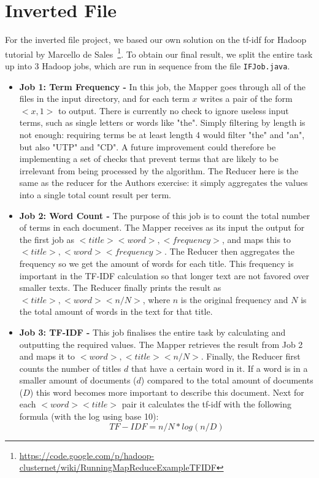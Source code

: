 \documentclass[11pt]{article}
\begin{document}
\section{Inverted File}
For the inverted file project, we based our own solution on the tf-idf for Hadoop tutorial by Marcello de Sales~\footnote{\url{https://code.google.com/p/hadoop-clusternet/wiki/RunningMapReduceExampleTFIDF}}. To obtain our final result, we split the entire task up into 3 Hadoop jobs, which are run in sequence from the file \lstinline{IFJob.java}.

\begin{itemize}

\item \textbf{Job 1: Term Frequency -} In this job, the Mapper goes through all of the files in the input directory, and for each term $x$ writes a pair of the form $<x, 1>$ to output. There is currently no check to ignore useless input terms, such as single letters or words like "the". Simply filtering by length is not enough: requiring terms be at least length 4 would filter "the" and "an", but also "UTP" and "CD". A future improvement could therefore be implementing a set of checks that prevent terms that are likely to be irrelevant from being processed by the algorithm.
The Reducer here is the same as the reducer for the Authors exercise: it simply aggregates the values into a single total count result per term.
\item \textbf{Job 2: Word Count -} The purpose of this job is to count the total number of terms in each document. The Mapper receives as its input the output for the first job as $<title><word>,<frequency>$, and maps this to $<title>, <word><frequency>$. The Reducer then aggregates the frequency so we get the amount of words for each title. This frequency is important in the TF-IDF calculation so that longer text are not favored over smaller texts. The Reducer finally prints the result as $<title>, <word><n/N>$, where $n$ is the original frequency and $N$ is the total amount of words in the text for that title.
\item \textbf{Job 3: TF-IDF -} This job finalises the entire task by calculating and outputting the required values. The Mapper retrieves the result from Job 2 and maps it to $<word>, <title><n/N>$. Finally, the Reducer first counts the number of titles $d$ that have a certain word in it. If a word is in a smaller amount of documents ($d$) compared to the total amount of documents ($D$) this word becomes more important to describe this document. Next for each $<word><title>$ pair it calculates the tf-idf with the following formula (with the log using base 10): $$TF-IDF = n/N * log(n/D)$$
\end{itemize}
\end{document}

